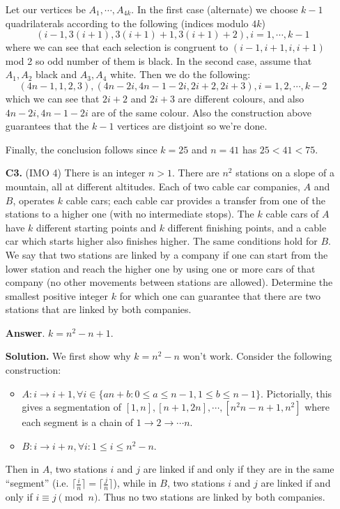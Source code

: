 \documentclass[11pt,a4paper]{article}
\begin{document}
\begin{enumerate}
    Let our vertices be $A_1, \cdots, A_{4k}$. 
    In the first case (alternate) we choose $k-1$ quadrilaterals according to the following (indices modulo $4k$)
    \[
    (i-1, 3(i+1), 3(i+1)+1, 3(i+1)+2), i=1, \cdots, k-1
    \]
    where we can see that each selection is congruent to $(i-1, i+1, i, i+1)$ mod 2 so odd number of them is black. 
    In the second case, assume that $A_1, A_2$ black and $A_3, A_4$ white. Then we do the following: 
    \[(4n-1, 1, 2, 3), 
    (4n - 2i, 4n-1-2i, 2i+2, 2i+3), i=1, 2, \cdots, k-2
    \]
    which we can see that $2i+2$ and $2i+3$ are different colours, and also $4n - 2i, 4n-1-2i$ are of the same colour. 
    Also the construction above guarantees that the $k-1$ vertices are distjoint so we're done. 
    
    Finally, the conclusion follows since $k=25$ and $n=41$ has $25<41<75$. 
	
	\item [\textbf{C3.}] (IMO 4) There is an integer $n > 1$. There are $n^2$ stations on a slope of a mountain, all at different altitudes. Each of two cable car companies, $A$ and $B$, operates $k$ cable cars; each cable car provides a transfer from one of the stations to a higher one (with no intermediate stops). The $k$ cable cars of $A$ have $k$ different starting points and $k$ different finishing points, and a cable car which starts higher also finishes higher. The same conditions hold for $B$. We say that two stations are linked by a company if one can start from the lower station and reach the higher one by using one or more cars of that company (no other movements between stations are allowed). Determine the smallest positive integer $k$ for which one can guarantee that there are two stations that are linked by both companies.
	
	\textbf{Answer}. $k=n^2-n+1$. 
	
	\textbf{Solution.} We first show why $k=n^2-n$ won't work. Consider the following construction: 
	\begin{itemize}
		\item $A: i\to i+1, \forall i\in \{an+b: 0\le a\le n-1, 1\le b\le n-1\}$.  Pictorially, this gives a segmentation of $[1, n], [n+1, 2n], \cdots , [n^2n-n+1, n^2]$ where each segment is a chain of $1\to 2\to\cdots n$. 
		\item $B: i\to i+n, \forall i: 1\le i\le n^2-n$. 
	\end{itemize}
	Then in $A$, two stations $i$ and $j$ are linked if and only if they are in the same ``segment'' (i.e. $\lceil \frac{i}{n}\rceil=\lceil\frac{j}{n}\rceil$), while in $B$, two stations $i$ and $j$ are linked if and only if $i\equiv j\pmod{n}$. Thus no two stations are linked by both companies. 
	

\end{enumerate}
\end{document}

